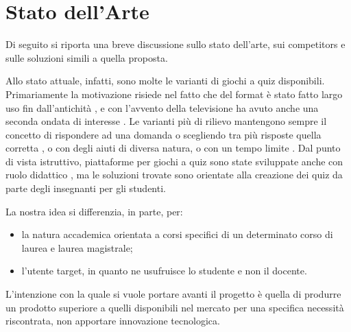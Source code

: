 

\chapter{Stato dell'Arte}
 Di seguito si riporta una breve discussione sullo stato dell'arte, sui competitors e sulle soluzioni simili a quella proposta.
 
 Allo stato attuale, infatti, sono molte le varianti di giochi a quiz disponibili. Primariamente la motivazione risiede nel fatto che del format è stato fatto largo uso fin dall'antichità \cite{quizgame}, e con l'avvento della televisione ha avuto anche una seconda ondata di interesse \cite{gameshow}. Le varianti più di rilievo mantengono sempre il concetto di rispondere ad una domanda o scegliendo tra più risposte quella corretta \cite{whowantstobeamillionaire}, o con degli aiuti di diversa natura, o con un tempo limite \cite{jeopardy}. 
 Dal punto di vista istruttivo, piattaforme per giochi a quiz sono state sviluppate anche con ruolo didattico \cite{quizlet}, ma le soluzioni trovate sono orientate alla creazione dei quiz da parte degli insegnanti per gli studenti.
 
 La nostra idea si differenzia, in parte, per: 
\begin{itemize}
    \item la natura accademica orientata a corsi specifici di un determinato corso di laurea e laurea magistrale;
    \item l'utente target, in quanto ne usufruisce lo studente e non il docente.
\end{itemize}
 
L'intenzione con la quale si vuole portare avanti il progetto è quella di produrre un prodotto superiore a quelli disponibili nel mercato per una specifica necessità riscontrata, non apportare innovazione tecnologica.